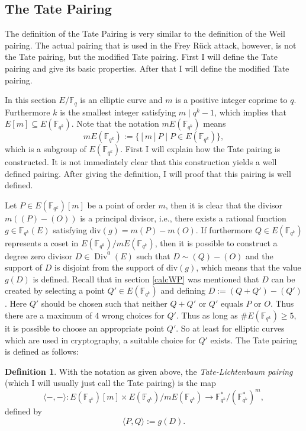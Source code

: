 \documentclass{article}
\numberwithin{equation}{section}
\theoremstyle{definition}
\newtheorem{definition}[theorem]{Definition}
\newcommand{\FF}[1]{{\mathbb F}_{#1}} %
\newcommand{\Div}{\operatorname{Div}} %
\begin{document}
\subsection{The Tate Pairing}\label{tatepairingsection}
The definition of the Tate Pairing is very similar to the definition of the Weil pairing. The actual pairing that is used in the Frey R\"uck attack, however, is not the Tate pairing, but the modified Tate pairing. First I will define the Tate pairing and give its basic properties. After that I will define the modified Tate pairing.\par 
In this section $E/\FF{q}$ is an elliptic curve and $m$ is a positive integer coprime to $q$. Furthermore $k$ is the smallest integer satisfying $m \mid q^k-1$, which implies that $E[m] \subseteq E(\FF{q^k})$. Note that the notation $mE(\FF{q^k})$ means $$mE(\FF{q^k}):=\{[m]P \; | \; P \in E(\FF{q^k})\},$$ which is a subgroup of $E(\FF{q^k})$. First I will explain how the Tate pairing is constructed. It is not immediately clear that this construction yields a well defined pairing. After giving the definition, I will proof that this pairing is well defined.\par 
Let $P \in E(\FF{q^k})[m]$ be a point of order $m$, then it is clear that the divisor $m((P)-(O))$ is a principal divisor, i.e., there exists a rational function $g \in \FF{q^k}(E)$ satisfying div$(g)=m(P)-m(O)$. If furthermore $Q\in E(\FF{q^k})$ represents a coset in $E(\FF{q^k})/mE(\FF{q^k})$, then it is possible to construct a degree zero divisor $D \in \Div^0(E)$ such that $D \sim (Q)-(O)$ and the support of $D$ is disjoint from the support of div$(g)$, which means that the value $g(D)$ is defined. Recall that in section \ref{calcWP} was mentioned that $D$ can be created by selecting a point $Q'\in E(\FF{q^k})$ and defining $D:=(Q+Q')-(Q')$. Here $Q'$ should be chosen such that neither $Q+Q'$ or $Q'$ equals $P$ or $O$. Thus there are a maximum of $4$ wrong choices for $Q'$. Thus as long as $\#E(\FF{q^k}) \geq 5$, it is possible to choose an appropriate point $Q'$. So at least for elliptic curves which are used in cryptography, a suitable choice for $Q'$ exists. The Tate pairing is defined as follows:

\begin{definition}\label{tatepairingdef}
With the notation as given above, the \emph{Tate-Lichtenbaum pairing} (which I will usually just call the Tate pairing) is the map $$\langle -,-\rangle: E(\FF{q^k})[m] \times E(\FF{q^k})/mE(\FF{q^k}) \rightarrow \FF{q^k}^*/(\FF{q^k}^*)^m,$$ defined by $$\langle P,Q \rangle := g(D).$$
\end{definition}
\end{document}
